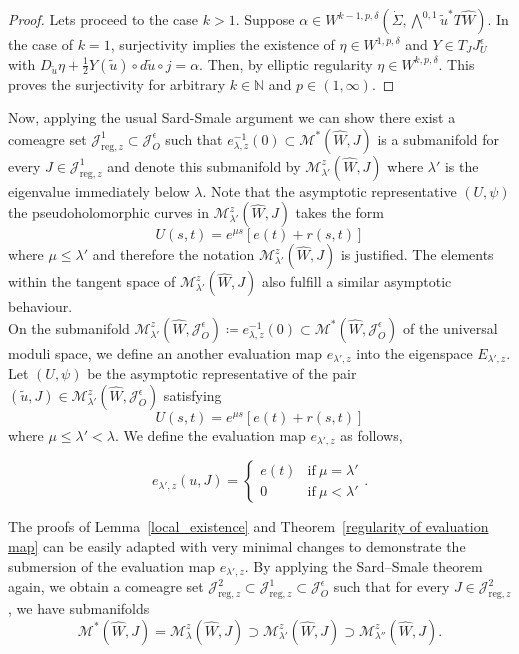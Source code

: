 \documentclass[11pt, a4paper]{amsart}
\newcommand{\cJ}{\mathcal{J}}
\newcommand{\cM}{\mathcal{M}}
\begin{document}
\begin{proof}
Lets proceed to the case $k>1$. Suppose $\alpha \in W^{k-1,p,\delta}\left(\dot{\Sigma}, \bigwedge\nolimits^{0,1}\tilde{u}^*T\widehat{W}\right)$. In the case of $k=1$, surjectivity implies the existence of $\eta \in W^{1,p,\delta}$ and
$Y \in T_{J} J^{\epsilon}_U$ with $D_{\tilde{u}} \eta + \frac{1}{2}Y(\tilde{u}) \circ d\tilde{u} \circ j = \alpha$. Then, by elliptic regularity $\eta\in W^{k,p,\delta}$. This proves the surjectivity for arbitrary $k\in \mathbb{N}$ and $p\in(1,\infty)$.

\end{proof}


Now, applying the usual Sard-Smale argument we can show there exist a comeagre set $\cJ^1_{\mathrm{reg},z} \subset \cJ^{\epsilon}_{O}$ such that $e_{\lambda,z}^{-1}(0) \subset \cM^*(\widehat{W},J)$ is a submanifold for every $J \in \cJ^1_{\mathrm{reg},z}$ and denote this submanifold by $\cM_{\lambda'}^z(\widehat{W},J)$ where $\lambda'$ is the eigenvalue immediately below $\lambda$. Note that the asymptotic representative $(U,\psi)$ the pseudoholomorphic curves in $\cM_{\lambda'}^z(\widehat{W},J)$ takes the form 
$$U(s, t) = e^{\mu s} [e(t) + r (s, t)]$$
where $\mu \leq \lambda'$ and therefore the notation $\cM_{\lambda'}^z(\widehat{W},J)$ is justified. The elements within the tangent space of $\cM_{\lambda'}^z(\widehat{W},J)$ also fulfill a similar asymptotic behaviour.\\

On the submanifold $\cM^z_{\lambda'}(\widehat{W},\cJ^{\epsilon}_O)\coloneqq e_{\lambda,z}^{-1}(0)\subset \cM^*(\widehat{W},\cJ^{\epsilon}_O)$ of the universal moduli space, we define an another evaluation map $e_{\lambda',z}$ into the eigenspace $E_{\lambda',z}$. Let $(U, \psi)$ be the asymptotic representative of the pair $(\tilde{u},J) \in \cM^z_{\lambda'}(\widehat{W},\cJ^{\epsilon}_O)$ satisfying
$$U(s, t) = e^{\mu s} [e(t) + r (s, t)]$$
where $\mu \leq \lambda'< \lambda$. We define the evaluation map $e_{\lambda',z}$ as follows,

\[ e_{\lambda',z}(u,J)= \begin{cases} 
      e(t) & \mathrm{if\ } \mu=\lambda'\\
      0 & \mathrm{if\ } \mu <\lambda'
   \end{cases}.
\]

The proofs of Lemma~\ref{local_existence} and Theorem~\ref{regularity of evaluation map} can be easily adapted with very minimal changes to demonstrate the submersion of the evaluation map $e_{\lambda',z}$. By applying the Sard--Smale theorem again, we obtain a comeagre set $\cJ^2_{\mathrm{reg},z} \subset \cJ^1_{\mathrm{reg},z} \subset \cJ^{\epsilon}_{O}$ such that for every $J\in \cJ^2_{\mathrm{reg},z}$, we have submanifolds
$$\cM^*(\widehat{W},J) = \cM^z_{\lambda}(\widehat{W},J) \supset \cM^z_{\lambda'}(\widehat{W},J)\supset \cM^z_{\lambda{''}}(\widehat{W},J).$$
\end{document}
